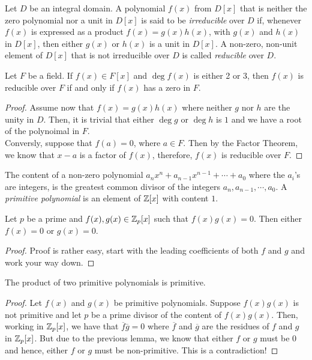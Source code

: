 \begin{definition}
	Let $D$ be an integral domain. A polynomial $f(x)$ from $D[x]$ that is neither the zero polynomial nor a unit in $D[x]$ is said to be \textit{irreducible} over $D$ if, whenever $f(x)$ is expressed as a product $f(x)=g(x)h(x)$, with $g(x)$ and $h(x)$ in $D[x]$, then either $g(x)$ or $h(x)$ is a unit in $D[x]$. A non-zero, non-unit element of $D[x]$ that is not irreducible over $D$ is called \textit{reducible} over $D$.
\end{definition}

\begin{proposition}
	Let $F$ be a field. If $f(x)\in F[x]$ and $\deg f(x)$ is either 2 or 3, then $f(x)$ is reducible over $F$ if and only if $f(x)$ has a zero in $F$.
\end{proposition}
\begin{proof}
	Assume now that $f(x)=g(x)h(x)$ where neither $g$ nor $h$ are the unity in $D$. Then, it is trivial that either $\deg g$ or $\deg h$ is $1$ and we have a root of the polynoimal in $F$.\\
	Conversly, suppose that $f(a)=0$, where $a\in F$. Then by the Factor Theorem, we know that $x-a$ is a factor of $f(x)$, therefore, $f(x)$ is reducible over $F$.
\end{proof}

\begin{definition}
	The content of a non-zero polynomial $a_nx^n+a_{n-1}x^{n-1}+\cdots+a_0$ where the $a_i$'s are integers, is the greatest common divisor of the integers $a_n,a_{n-1},\cdots,a_0$. A  \textit{primitive polynomial} is an element of $\mathbb{Z}[x]$ with content $1$.
\end{definition}

\begin{lemma}
	Let $p$ be a prime and $f(x),g(x)\in\mathbb{Z}_p[x]$ such that $f(x)g(x)=0$. Then either $f(x)=0$ or $g(x)=0$.
\end{lemma}
\begin{proof}
	Proof is rather easy, start with the leading coefficients of both $f$ and $g$ and work your way down.
\end{proof}

\begin{theorem}[Gauß]
	The product of two primitive polynomials is primitive.
\end{theorem}
\begin{proof}
	Let $f(x)$ and $g(x)$ be primitive polynomials. Suppose $f(x)g(x)$ is not primitive and let $p$ be a prime divisor of the content of $f(x)g(x)$. Then, working in $\mathbb{Z}_p[x]$, we have that $\overline{f}\overline{g}=0$ where $\overline{f}$ and $\overline{g}$ are the residues of $f$ and $g$ in $\mathbb{Z}_p[x]$. But due to the previous lemma, we know that either $f$ or $g$ must be $0$ and hence, either $f$ or $g$ must be non-primitive. This is a contradiction!
\end{proof}

